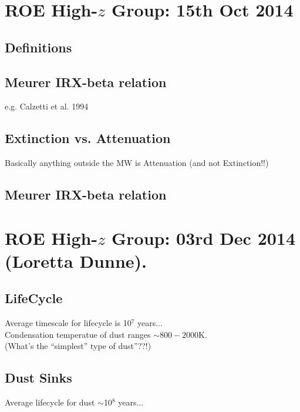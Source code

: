 \documentclass[11pt]{article}
\begin{document}
\newpage


\section{ROE High-$z$ Group: 15th Oct 2014}

    \subsection{Definitions}

    \subsection{Meurer IRX-beta relation}
    e.g. Calzetti et al. 1994\\
    
    
    \subsection{Extinction vs. Attenuation}
    Basically anything outside the MW is Attenuation (and not Extinction!!) \\
    
    \subsection{Meurer IRX-beta relation}
    
    
\section{ROE High-$z$ Group: 03rd Dec 2014 (Loretta Dunne).}
    \subsection{LifeCycle}
    Average timescale for lifecycle is 10$^7$ years...\\
    Condensation temperatue of dust ranges $\sim800-2000$K. \\
    (What's the ``simplest'' type of dust''??!) \\

    \subsection{Dust Sinks}
    Average lifecycle for dust $\sim$10$^8$ years...\\
\end{document}
